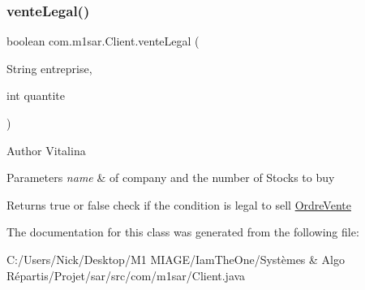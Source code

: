 \subsubsection{\texorpdfstring{vente\+Legal()}{venteLegal()}}
{\footnotesize\ttfamily boolean com.\+m1sar.\+Client.\+vente\+Legal (\begin{DoxyParamCaption}\item[{String}]{entreprise,  }\item[{int}]{quantite }\end{DoxyParamCaption})}

\begin{DoxyAuthor}{Author}
Vitalina 
\end{DoxyAuthor}

\begin{DoxyParams}{Parameters}
{\em name} & of company and the number of Stocks to buy \\
\hline
\end{DoxyParams}
\begin{DoxyReturn}{Returns}
true or false check if the condition is legal to sell \hyperlink{classcom_1_1m1sar_1_1_ordre_vente}{Ordre\+Vente} 
\end{DoxyReturn}


The documentation for this class was generated from the following file\+:\begin{DoxyCompactItemize}
\item 
C\+:/\+Users/\+Nick/\+Desktop/\+M1 M\+I\+A\+G\+E/\+Iam\+The\+One/\+Systèmes \& Algo Répartis/\+Projet/sar/src/com/m1sar/Client.\+java\end{DoxyCompactItemize}
